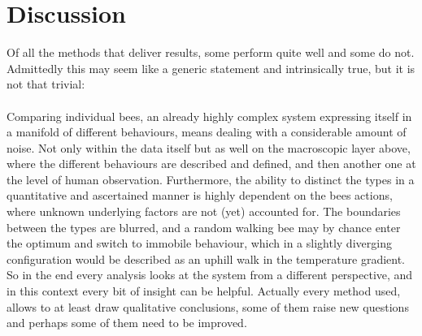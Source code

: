 \chapter{Discussion}
\label{cha:Discussion}


Of all the methods that deliver results, some perform quite well and some do not. Admittedly this may seem like a generic statement and intrinsically true, but it is not that trivial:
\\
\\
Comparing individual bees, an already highly complex system expressing itself in a manifold of different behaviours, means dealing with a considerable amount of noise. Not only within the data itself but as well on the macroscopic layer above, where the different behaviours are described and defined, and then another one at the level of human observation. Furthermore, the ability to distinct the types in a quantitative and ascertained manner is highly dependent on the bees actions, where unknown underlying factors are not (yet) accounted for. The boundaries between the types are blurred, and a random walking bee may by chance enter the optimum and switch to immobile behaviour, which in a slightly diverging configuration would be described as an uphill walk in the temperature gradient.
So in the end every analysis looks at the system from a different perspective, and in this context every bit of insight can be helpful.
Actually every method used, allows to at least draw qualitative conclusions, some of them raise new questions and perhaps some of them need to be improved.
\\
\\
